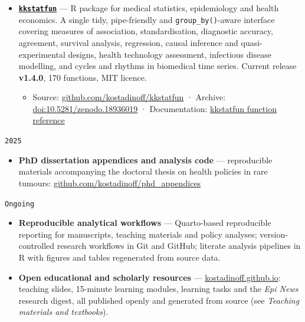 \documentclass[
  10.5pt,
  a4paper,
  DIV=11,
  numbers=noendperiod]{scrartcl}
\providecommand{\tightlist}{%
  \setlength{\itemsep}{0pt}\setlength{\parskip}{0pt}}
\let\oldtexttt\texttt
\renewcommand{\texttt}[1]{{\color{cvbronze}\small\oldtexttt{#1}}}
\begin{document}
\begin{itemize}
\tightlist
\item
  \textbf{\href{kkstatfun.qmd}{\texttt{kkstatfun}}} --- R package for
  medical statistics, epidemiology and health economics. A single tidy,
  pipe-friendly and \texttt{group\_by()}-aware interface covering
  measures of association, standardisation, diagnostic accuracy,
  agreement, survival analysis, regression, causal inference and
  quasi-experimental designs, health technology assessment, infectious
  disease modelling, and cycles and rhythms in biomedical time series.
  Current release \textbf{v1.4.0}, 170 functions, MIT licence.

  \begin{itemize}
  \tightlist
  \item
    Source:
    \href{https://github.com/kostadinoff/kkstatfun}{github.com/kostadinoff/kkstatfun}
    · Archive:
    \href{https://doi.org/10.5281/zenodo.18936019}{doi:10.5281/zenodo.18936019}
    · Documentation: \href{kkstatfun.qmd}{kkstatfun function reference}
  \end{itemize}
\end{itemize}

\texttt{2025}

\begin{itemize}
\tightlist
\item
  \textbf{PhD dissertation appendices and analysis code} ---
  reproducible materials accompanying the doctoral thesis on health
  policies in rare tumours:
  \href{https://github.com/kostadinoff/phd_appendices}{github.com/kostadinoff/phd\_appendices}
\end{itemize}

\texttt{Ongoing}

\begin{itemize}
\tightlist
\item
  \textbf{Reproducible analytical workflows} --- Quarto-based
  reproducible reporting for manuscripts, teaching materials and policy
  analyses; version-controlled research workflows in Git and GitHub;
  literate analysis pipelines in R with figures and tables regenerated
  from source data.
\item
  \textbf{Open educational and scholarly resources} ---
  \href{https://kostadinoff.github.io}{kostadinoff.github.io}: teaching
  slides, 15-minute learning modules, learning tasks and the \emph{Epi
  News} research digest, all published openly and generated from source
  (see \emph{Teaching materials and textbooks}).
\end{itemize}
\end{document}
